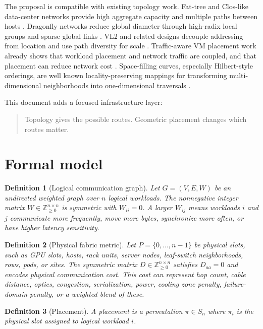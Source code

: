 \documentclass[11pt]{article}
\newtheorem{definition}{Definition}[section]
\theoremstyle{remark}
\begin{document}
The proposal is compatible with existing topology work. Fat-tree and Clos-like data-center networks provide high aggregate capacity and multiple paths between hosts \cite{alfares2008fat,singh2015jupiter}. Dragonfly networks reduce global diameter through high-radix local groups and sparse global links \cite{kim2008dragonfly}. VL2 and related designs decouple addressing from location and use path diversity for scale \cite{greenberg2009vl2}. Traffic-aware VM placement work already shows that workload placement and network traffic are coupled, and that placement can reduce network cost \cite{meng2010improving,jiang2012joint}. Space-filling curves, especially Hilbert-style orderings, are well known locality-preserving mappings for transforming multi-dimensional neighborhoods into one-dimensional traversals \cite{moon2001hilbert,mokbel2003space}.

This document adds a focused infrastructure layer:
\begin{quote}
Topology gives the possible routes. Geometric placement changes which routes matter.
\end{quote}

\section{Formal model}

\begin{definition}[Logical communication graph]
Let $G=(V,E,W)$ be an undirected weighted graph over $n$ logical workloads. The nonnegative integer matrix $W\in\mathbb{Z}_{\ge 0}^{n\times n}$ is symmetric with $W_{ii}=0$. A larger $W_{ij}$ means workloads $i$ and $j$ communicate more frequently, move more bytes, synchronize more often, or have higher latency sensitivity.
\end{definition}

\begin{definition}[Physical fabric metric]
Let $P=\{0,\ldots,n-1\}$ be physical slots, such as GPU slots, hosts, rack units, server nodes, leaf-switch neighborhoods, rows, pods, or sites. The symmetric matrix $D\in\mathbb{Z}_{\ge 0}^{n\times n}$ satisfies $D_{aa}=0$ and encodes physical communication cost. This cost can represent hop count, cable distance, optics, congestion, serialization, power, cooling zone penalty, failure-domain penalty, or a weighted blend of these.
\end{definition}

\begin{definition}[Placement]
A placement is a permutation $\pi\in S_n$ where $\pi_i$ is the physical slot assigned to logical workload $i$.
\end{definition}
\end{document}
